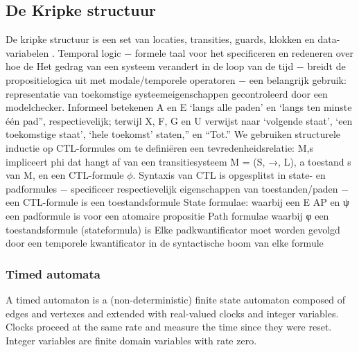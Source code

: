 \documentclass{article}
\begin{document}
	\subsection{De Kripke structuur}
	De kripke structuur is een set van locaties, transities, guards, klokken en data-variabelen .	
	Temporal logic
	− formele taal voor het specificeren en redeneren over hoe de
	Het gedrag van een systeem verandert in de loop van de tijd
	− breidt de propositielogica uit met modale/temporele operatoren
	− een belangrijk gebruik: representatie van toekomstige systeemeigenschappen
	gecontroleerd door een modelchecker.	
	Informeel betekenen A en E ‘langs alle paden’ en ‘langs
	ten minste één pad”, respectievelijk; terwijl X, F, G en
	U verwijst naar ‘volgende staat’, ‘een toekomstige staat’, ‘hele toekomst’
	staten,” en “Tot.”	
	We gebruiken structurele inductie op CTL-formules om te definiëren
	een tevredenheidsrelatie: M,s impliceert phi
	dat hangt af van een transitiesysteem M = (S, →, L), a
	toestand s van M, en een CTL-formule $\phi$.	
	Syntaxis van CTL is opgesplitst in state- en padformules
	− specificeer respectievelijk eigenschappen van toestanden/paden
	− een CTL-formule is een toestandsformule	
	State formulae: 
	waarbij een E AP en ψ een padformule is voor een atomaire propositie	
	Path formulae 
	waarbij φ een toestandsformule (stateformula) is	
	Elke padkwantificator moet worden gevolgd door een temporele kwantificator in de
	syntactische boom van elke formule
		\subsubsection{Timed automata}
		A timed automaton is a (non-deterministic) finite state
		automaton composed of edges and vertexes and extended
		with real-valued clocks and integer variables. Clocks proceed
		at the same rate and measure the time since they were
		reset. Integer variables are finite domain variables with
		rate zero.
		
\end{document}
